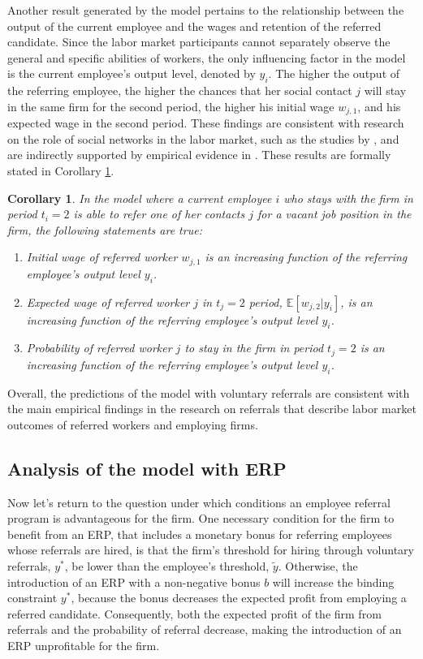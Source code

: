 \documentclass[12pt]{article}
\newtheorem{corollary}[theorem]{Corollary}
\begin{document}
Another result generated by the model pertains to the relationship between the output of the current employee and the wages and retention of the referred candidate. Since the labor market participants cannot separately observe the general and specific abilities of workers, the only influencing factor in the model is the current employee's output level, denoted by $y_i$. The higher the output of the referring employee, the higher the chances that her social contact $j$ will stay in the same firm for the second period, the higher his initial wage $w_{j,1}$, and his expected wage in the second period. These findings are consistent with research on the role of social networks in the labor market, such as the studies by \cite{saloner1985old, simon1992matchmaker}, and are indirectly supported by empirical evidence in \cite{pallais2016referential, lalanne2016old, levati2020impact}. These results are formally stated in Corollary \ref{cor:relation_current_empl}.
\begin{corollary}\label{cor:relation_current_empl}
    In the model where a current employee $i$ who stays with the firm in period $t_i = 2$ is able to refer one of her contacts $j$ for a vacant job position in the firm, the following statements are true:
    \begin{enumerate}[label={\roman*})]
        \item Initial wage of referred worker $w_{j,1}$ is an increasing function of the referring employee's output level $y_i$.
        \item Expected wage of referred worker $j$ in $t_j = 2$ period,  $\mathbb{E}[w_{j,2}|y_i]$, is an increasing function of the referring employee's output level $y_i$.
        \item Probability of referred worker $j$ to stay in the firm in period $t_j = 2$ is an increasing function of the referring employee's output level $y_i$.
    \end{enumerate}
\end{corollary}

Overall, the predictions of the model with voluntary referrals are consistent with the main empirical findings in the research on referrals that describe labor market outcomes of referred workers and employing firms. 

\subsection{Analysis of the model with ERP}

Now let's return to the question under which conditions an employee referral program is advantageous for the firm. One necessary condition for the firm to benefit from an ERP, that includes a monetary bonus for referring employees whose referrals are hired, is that the firm's threshold for hiring through voluntary referrals, $y^*$, be lower than the employee's threshold, $\tilde{y}$. Otherwise, the introduction of an ERP with a non-negative bonus $b$ will increase the binding constraint $y^*$, because the bonus decreases the expected profit from employing a referred candidate. Consequently, both the expected profit of the firm from referrals and the probability of referral decrease, making the introduction of an ERP unprofitable for the firm.
\end{document}
